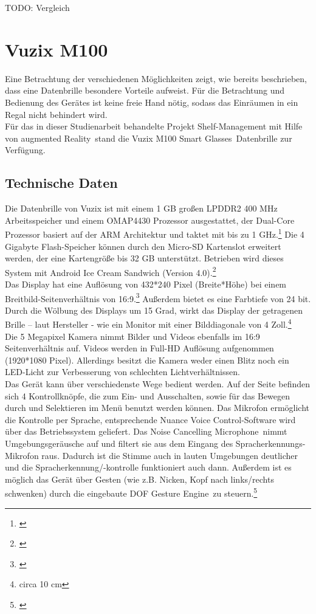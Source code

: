 TODO: Vergleich

\section{Vuzix M100}
\label{sec:vuzix}
Eine Betrachtung der verschiedenen Möglichkeiten zeigt, wie bereits beschrieben, dass eine Datenbrille besondere Vorteile aufweist. Für die Betrachtung und Bedienung des Gerätes ist keine freie Hand nötig, sodass das Einräumen in ein Regal nicht behindert wird.\\

Für das in dieser Studienarbeit behandelte Projekt \glqq Shelf-Management mit Hilfe von augmented Reality\grqq\ stand die \glqq Vuzix M100 Smart Glasses\grqq\ Datenbrille zur Verfügung.

\subsection{Technische Daten}
Die Datenbrille von Vuzix ist mit einem 1 \ac{GB} großen LPDDR2 400 \ac{MHz} Arbeitsspeicher und einem OMAP4430 Prozessor ausgestattet, der Dual-Core Prozessor basiert auf der \ac{ARM} Architektur und taktet mit bis zu 1 \ac{GHz}.\footnote{\citep{omap4430}} Die 4 Gigabyte Flash-Speicher können durch den Micro-\acs{SD} Kartenslot erweitert werden, der eine Kartengröße bis 32 \ac{GB} unterstützt. Betrieben wird dieses System mit Android Ice Cream Sandwich (Version 4.0).\footnote{\citep{vuzixm100}}\\

Das Display hat eine Auflösung von 432*240 Pixel (Breite*Höhe) bei einem Breitbild-Seitenverhältnis von 16:9.\footnote{\citep{wqvga}} Außerdem bietet es eine Farbtiefe von 24 bit. Durch die Wölbung des Displays um 15 Grad, wirkt das Display der getragenen Brille – laut Hersteller - wie ein Monitor mit einer Bilddiagonale von 4 Zoll.\footnote{circa 10 \ac{cm}}\\

Die 5 Megapixel Kamera nimmt Bilder und Videos ebenfalls im 16:9 Seitenverhältnis auf. Videos werden in Full-HD Auflösung aufgenommen (1920*1080 Pixel). Allerdings besitzt die Kamera weder einen Blitz noch ein LED-Licht zur Verbesserung von schlechten Lichtverhältnissen.\\

Das Gerät kann über verschiedenste Wege bedient werden. Auf der Seite befinden sich 4 Kontrollknöpfe, die zum Ein- und Ausschalten, sowie für das Bewegen durch und Selektieren im Menü benutzt werden können. Das Mikrofon ermöglicht die Kontrolle per Sprache, entsprechende \glqq Nuance Voice Control\grqq -Software wird über das Betriebssystem geliefert. Das \glqq Noise Cancelling Microphone\grqq\ nimmt Umgebungsgeräusche auf und filtert sie aus dem Eingang des Spracherkennungs-Mikrofon raus. Dadurch ist die Stimme auch in lauten Umgebungen deutlicher und die Spracherkennung/-kontrolle funktioniert auch dann. Außerdem ist es möglich das Gerät über Gesten (wie z.B. Nicken, Kopf nach links/rechts schwenken) durch die eingebaute  DOF Gesture Engine\grqq\ zu steuern.\footnote{\citep{vuzixm100}}\\

